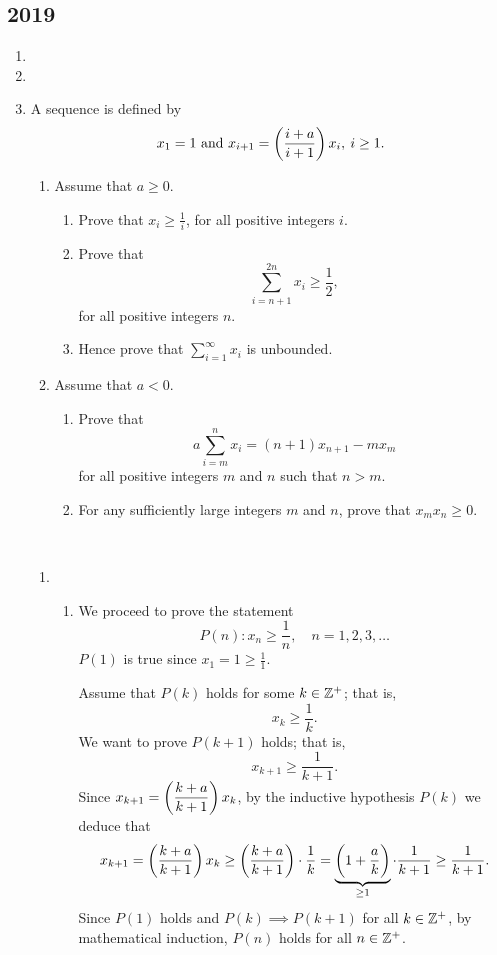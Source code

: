 \subsection*{2019}
\begin{enumerate}
\item 

\item 

\item A sequence is defined by
\[ x_1=1\text{ and }x_{i+1}=\left(\frac{i+a}{i+1}\right)x_i,\:i\ge1. \]
\begin{enumerate}[label=(\roman*)]
\item Assume that $a\ge0$.
\begin{enumerate}[label=(\alph*)]
    \item Prove that $x_i\ge\frac{1}{i}$, for all positive integers $i$.
    \item Prove that
    \[ \sum_{i=n+1}^{2n}x_i\ge\frac{1}{2}, \]
    for all positive integers $n$.
    \item Hence prove that $\displaystyle\sum_{i=1}^\infty x_i$ is unbounded.
\end{enumerate}
\item Assume that $a<0$.
\begin{enumerate}[label=(\alph*)]
    \item Prove that
    \[ a\sum_{i=m}^nx_i=(n+1)x_{n+1}-mx_m \]
    for all positive integers $m$ and $n$ such that $n>m$.
    \item For any sufficiently large integers $m$ and $n$, prove that $x_mx_n\ge0$.
\end{enumerate}
\end{enumerate}

\begin{solution} \
\begin{enumerate}[label=(\roman*)]
\item \begin{enumerate}[label=(\alph*)]
\item We proceed to prove the statement
\[ P(n):x_n\ge\frac{1}{n}, \quad n=1,2,3,\dots \]
$P(1)$ is true since $x_1=1\ge\frac{1}{1}$.

Assume that $P(k)$ holds for some $k\in\mathbb Z^+$; that is, 
\[ x_k\ge\frac{1}{k}. \]
We want to prove $P(k+1)$ holds; that is,
\[ x_{k+1}\ge\frac{1}{k+1}. \]
Since $x_{k+1}=\left(\dfrac{k+a}{k+1}\right)x_k$, by the inductive hypothesis $P(k)$ we deduce that
\[ x_{k+1}=\left(\frac{k+a}{k+1}\right)x_k\ge\left(\frac{k+a}{k+1}\right)\cdot\frac{1}{k}=\underbrace{\left(1+\frac{a}{k}\right)}_{\ge1}\cdot\frac{1}{k+1}\ge\frac{1}{k+1}. \]
Since $P(1)$ holds and $P(k)\implies P(k+1)$ for all $k\in\mathbb Z^+$, by mathematical induction, $P(n)$ holds for all $n\in\mathbb Z^+$.


\end{enumerate}
\end{enumerate}
\end{solution}
\end{enumerate}
